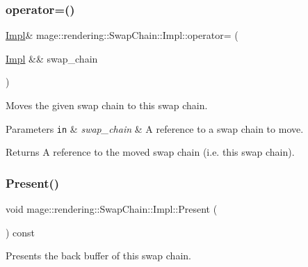 \subsubsection{\texorpdfstring{operator=()}{operator=()}\hspace{0.1cm}{\footnotesize\ttfamily [2/2]}}
{\footnotesize\ttfamily \hyperlink{classmage_1_1rendering_1_1_swap_chain_1_1_impl}{Impl}\& mage\+::rendering\+::\+Swap\+Chain\+::\+Impl\+::operator= (\begin{DoxyParamCaption}\item[{\hyperlink{classmage_1_1rendering_1_1_swap_chain_1_1_impl}{Impl} \&\&}]{swap\+\_\+chain }\end{DoxyParamCaption})\hspace{0.3cm}{\ttfamily [delete]}}

Moves the given swap chain to this swap chain.


\begin{DoxyParams}[1]{Parameters}
\mbox{\tt in}  & {\em swap\+\_\+chain} & A reference to a swap chain to move. \\
\hline
\end{DoxyParams}
\begin{DoxyReturn}{Returns}
A reference to the moved swap chain (i.\+e. this swap chain). 
\end{DoxyReturn}
\hypertarget{classmage_1_1rendering_1_1_swap_chain_1_1_impl_ae75839c2c767280d4c7e8ee009fedfe0}{}\label{classmage_1_1rendering_1_1_swap_chain_1_1_impl_ae75839c2c767280d4c7e8ee009fedfe0} 
\subsubsection{\texorpdfstring{Present()}{Present()}}
{\footnotesize\ttfamily void mage\+::rendering\+::\+Swap\+Chain\+::\+Impl\+::\+Present (\begin{DoxyParamCaption}{ }\end{DoxyParamCaption}) const\hspace{0.3cm}{\ttfamily [noexcept]}}

Presents the back buffer of this swap chain. \hypertarget{classmage_1_1rendering_1_1_swap_chain_1_1_impl_afbc1208702d9807bed1126caae22bda6}{}\label{classmage_1_1rendering_1_1_swap_chain_1_1_impl_afbc1208702d9807bed1126caae22bda6} 
